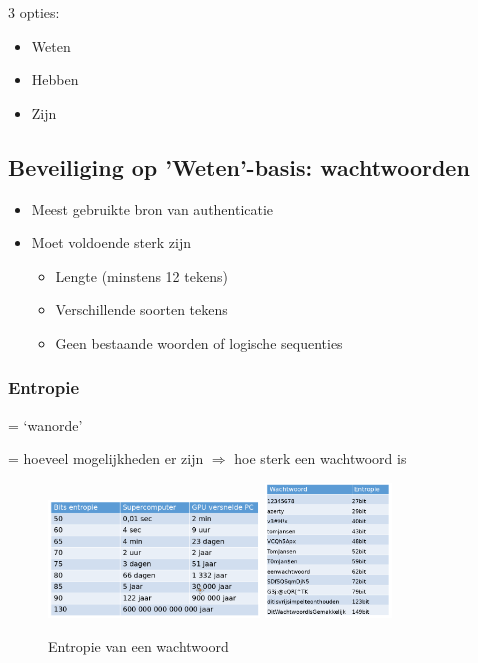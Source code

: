 \documentclass{article}
\begin{document}
3 opties: 
\begin{itemize}
    \item Weten
    \item Hebben
    \item Zijn
\end{itemize}

\subsection{Beveiliging op 'Weten'-basis: wachtwoorden}

\begin{itemize}
    \item Meest gebruikte bron van authenticatie
    \item Moet voldoende sterk zijn
    \begin{itemize}
        \item Lengte (minstens 12 tekens)
        \item Verschillende soorten tekens
        \item Geen bestaande woorden of logische sequenties
    \end{itemize}
\end{itemize}

\subsubsection{Entropie}

= `wanorde'

= hoeveel mogelijkheden er zijn $\Rightarrow$ hoe sterk een wachtwoord is

\begin{figure}[H]
    \centering
    \includegraphics[width=0.5\textwidth]{wachtwoord-entropie.png}
    \includegraphics[width=0.3\textwidth]{wachtwoord-entropie2.png}
    \caption{Entropie van een wachtwoord}
\end{figure}
\end{document}
